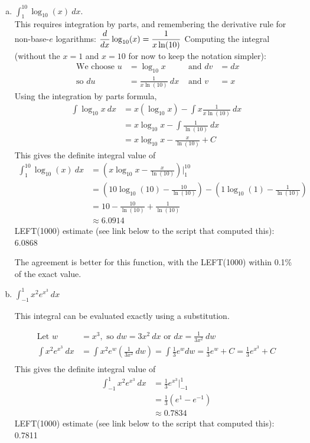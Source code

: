 \begin{enumerate}[1.]
\begin{Solution}
\begin{enumerate}[(a)]
\item $\displaystyle \int_1^{10} \log_{10}(x)~dx $.\\ This requires
  integration by parts, and remembering the derivative rule for
  non-base-$e$ logarithms:
  $\displaystyle \frac{d}{dx} \log_{10}(x) = \frac{1}{x \ln(10)}$ Computing the
  integral (without the $x=1$ and $x=10$ for now to keep the notation
  simpler):
    \begin{align*}
\mbox{ We choose }       u & = \log_{10} x&\mbox{ and } dv & = dx \\
\mbox{ so } du & = \frac{1}{x \ln(10)} ~dx& \mbox{ and } v & = x 
    \end{align*}
Using the integration by parts formula, 
\begin{align*}
  \int \log_{10} x~dx & = x (\log_{10} x) 
- \int x \frac{1}{x \ln(10)}~ dx \\
& = x \log_{10} x - \int \frac{1}{\ln(10)} ~dx \\
& = x \log_{10} x - \frac{x}{\ln(10)} + C  
\end{align*}
This gives the definite integral value of 
\begin{align*}
\int_1^{10} \log_{10}(x)~dx  & = \left(x \log_{10} x - \frac{x}{\ln(10)} \right) \Big|_1^{10} \\
& = \left(10 \log_{10}(10) - \frac{10}{\ln(10)}\right) 
- \left(1 \log_{10}(1) - \frac{1}{\ln(10)}\right)  \\
&  = 10 - \frac{10}{\ln(10)} + \frac{1}{\ln(10)} \\
& \approx 6.0914
\end{align*}
LEFT(1000) estimate (see link below to the script that computed this):  6.0868

The agreement is better for this function, with the LEFT(1000) within 0.1\% of the exact value.

\item $\displaystyle \int_{-1}^{1} x^2 e^{x^3}~dx$ 

This integral can be evaluated exactly using a substitution.

  \begin{align*}
    \mbox{Let }w & = x^3, \mbox{ so } dw=3x^2~dx \mbox{ or } dx = \frac{1}{3x^2}~dw\\
    \int x^2 e^{x^3}~dx & = \int x^2 e^w \left(\frac{1}{3x^2}~dw\right) = \int \frac{1}{3} e^w dw = \frac{1}{3} e^w + C = \frac{1}{3} e^{x^3} + C \\
\end{align*}
This gives the definite integral value of
\begin{align*}
\int_{-1}^{1} x^2 e^{x^3}~dx  & = \frac{1}{3} e^{x^3} \Big|_{-1}^1 \\ 
& = \frac{1}{3}\left( e^1 - e^{-1}\right) \\
& \approx 0.7834 
\end{align*}
LEFT(1000) estimate (see link below to the script that computed this):  0.7811


\end{enumerate}
\end{Solution}
\end{enumerate}
